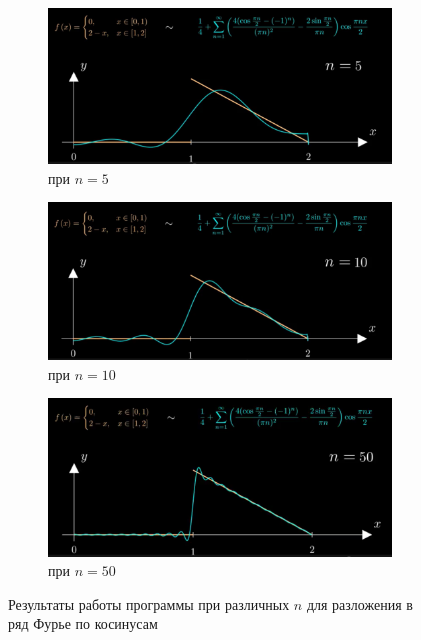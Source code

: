 \documentclass[a5paper, 10pt]{article}
\theoremstyle{definition}
\theoremstyle{plain}
\theoremstyle{remark}
\begin{document}
\begin{figure}
		\begin{center}
			\begin{subfigure}{0.7\linewidth}
				\includegraphics[width=\linewidth]{"./pictures/c_5.png"}
				\caption{при $n=5$}
			\end{subfigure}
			\begin{subfigure}{0.7\linewidth}
				\includegraphics[width=\linewidth]{"./pictures/c_10.png"}
				\caption{при $n=10$}
			\end{subfigure}
			\begin{subfigure}{0.7\linewidth}
				\includegraphics[width=\linewidth]{"./pictures/c_50.png"}
				\caption{при $n=50$}
			\end{subfigure}
		\caption{Результаты работы программы при различных $n$ для разложения в ряд Фурье по косинусам}\label{result}
		\end{center}
	\end{figure}
\end{document}
